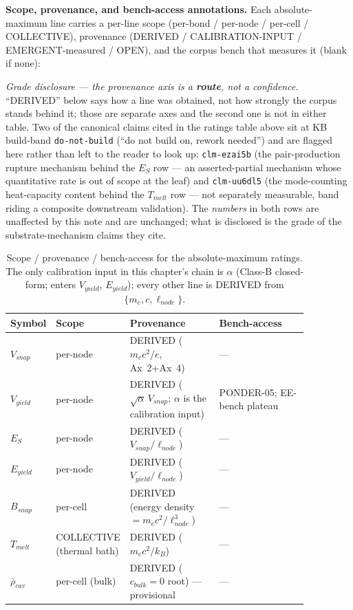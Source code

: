 \noindent
\textbf{Scope, provenance, and bench-access annotations.} Each absolute-maximum line carries a per-line scope (per-bond / per-node / per-cell / COLLECTIVE), provenance (DERIVED / CALIBRATION-INPUT / EMERGENT-measured / OPEN), and the corpus bench that measures it (blank if none):

\noindent
\emph{Grade disclosure --- the provenance axis is a \textbf{route}, not a confidence.} ``DERIVED'' below says how a line was obtained, not how strongly the corpus stands behind it; those are separate axes and the second one is not in either table. Two of the canonical claims cited in the ratings table above sit at KB build-band \texttt{do-not-build} (``do not build on, rework needed'') and are flagged here rather than left to the reader to look up: \texttt{clm-ezai5b} (the pair-production rupture mechanism behind the $E_S$ row --- an asserted-partial mechanism whose quantitative rate is out of scope at the leaf) and \texttt{clm-uu6dl5} (the mode-counting heat-capacity content behind the $T_{melt}$ row --- not separately measurable, band riding a composite downstream validation). The \emph{numbers} in both rows are unaffected by this note and are unchanged; what is disclosed is the grade of the substrate-mechanism claims they cite.

\begin{table}[htbp]
\centering\footnotesize
\setlength{\tabcolsep}{5pt}
\begin{tabular}{@{}p{0.10\linewidth} p{0.16\linewidth} p{0.30\linewidth} p{0.30\linewidth}@{}}
\toprule
\textbf{Symbol} & \textbf{Scope} & \textbf{Provenance} & \textbf{Bench-access} \\
\midrule
$V_{snap}$ & per-node & DERIVED ($m_e c^2/e$, Ax~2+Ax~4) & --- \\
$V_{yield}$ & per-node & DERIVED ($\sqrt{\alpha}\,V_{snap}$; $\alpha$ is the calibration input) & PONDER-05; EE-bench plateau \\
$E_S$ & per-node & DERIVED ($V_{snap}/\ell_{node}$) & --- \\
$E_{yield}$ & per-node & DERIVED ($V_{yield}/\ell_{node}$) & --- \\
$B_{snap}$ & per-cell & DERIVED (energy density $= m_e c^2/\ell_{node}^3$) & --- \\
$T_{melt}$ & COLLECTIVE (thermal bath) & DERIVED ($m_e c^2/k_B$) & --- \\
$\bar{\rho}_{cav}$ & per-cell (bulk) & DERIVED ($c_{bulk}=0$ root) --- provisional & --- \\
\bottomrule
\end{tabular}
\caption{Scope / provenance / bench-access for the absolute-maximum ratings. The only calibration input in this chapter's chain is $\alpha$ (Class-B closed-form; enters $V_{yield}$, $E_{yield}$); every other line is DERIVED from $\{m_e, c, \ell_{node}\}$.}
\label{tab:vol9_absmax_scope}
\end{table}

